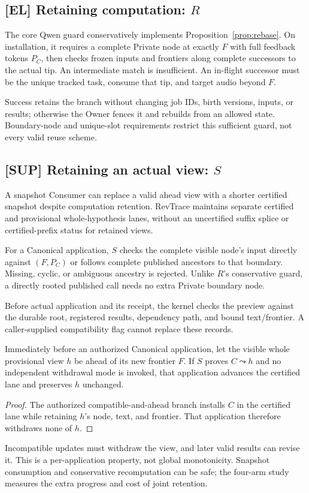 \subsection{[EL] Retaining computation: \texorpdfstring{$R$}{R}}
The core Qwen guard conservatively implements Proposition~\ref{prop:rebase}.
On installation, it requires a complete Private node at exactly $F$ with
full feedback tokens $P_C$, then checks frozen inputs and frontiers along
complete successors to the actual tip. An intermediate match is insufficient.
An in-flight successor must be the unique tracked task, consume that tip,
and target audio beyond $F$.

Success retains the branch without changing job IDs, birth versions,
inputs, or results; otherwise the Owner fences it and rebuilds from an
allowed state. Boundary-node and unique-slot requirements restrict this
sufficient guard, not every valid reuse scheme.

\subsection{[SUP] Retaining an actual view: \texorpdfstring{$S$}{S}}
A snapshot Consumer can replace a valid ahead view with a shorter
certified snapshot despite computation retention. RevTrace maintains
separate certified and provisional whole-hypothesis lanes, without an
uncertified suffix splice or certified-prefix status for retained views.

For a Canonical application, $S$ checks the complete visible node's input
directly against $(F,P_C)$ or follows complete published ancestors to
that boundary. Missing, cyclic, or ambiguous ancestry is rejected. Unlike
$R$'s conservative guard, a directly rooted published call needs no extra
Private boundary node.

Before actual application and its receipt, the kernel checks the preview
against the durable root, registered results, dependency path, and bound
text/frontier. A caller-supplied compatibility flag cannot replace these
records.

\begin{proposition}
\label{prop:continuity}
Immediately before an authorized Canonical application, let the visible
whole provisional view $h$ be ahead of its new frontier $F$. If $S$ proves
$C\leadsto h$ and no independent withdrawal mode is invoked, that
application advances the certified lane and preserves $h$ unchanged.
\end{proposition}
\begin{proof}
The authorized compatible-and-ahead branch installs $C$ in the certified
lane while retaining $h$'s node, text, and frontier. That application
therefore withdraws none of $h$.
\end{proof}

Incompatible updates must withdraw the view, and later valid results can
revise it. This is a per-application property, not global monotonicity.
Snapshot consumption and conservative recomputation can be safe; the
four-arm study measures the extra progress and cost of joint retention.
